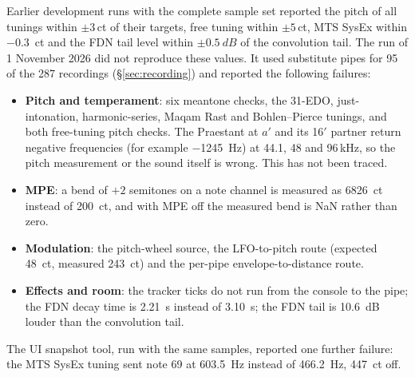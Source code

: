 \documentclass[11pt,a4paper,parskip=half,DIV=11,toc=bibliography]{scrartcl}
\begin{document}
Earlier development runs with the complete sample set reported the pitch of all tunings within $\pm3$\,ct of
their targets, free tuning within $\pm5$\,ct, MTS SysEx within \SI{-0.3}{ct} and the FDN tail level within
$\pm\SI{0.5}{dB}$ of the convolution tail. The run of 1 November 2026 did not reproduce these values. It used
substitute pipes for 95 of the 287 recordings (\S\ref{sec:recording}) and reported the following failures:
\begin{itemize}
  \item \textbf{Pitch and temperament}: six meantone checks, the 31-EDO, just-intonation, harmonic-series,
        Maqam Rast and Bohlen--Pierce tunings, and both free-tuning pitch checks. The Praestant at $a'$ and its
        16$'$ partner return negative frequencies (for example \SI{-1245}{Hz}) at 44.1, 48 and 96\,kHz, so the
        pitch measurement or the sound itself is wrong. This has not been traced.
  \item \textbf{MPE}: a bend of $+2$ semitones on a note channel is measured as \SI{6826}{ct} instead of
        \SI{200}{ct}, and with MPE off the measured bend is NaN rather than zero.
  \item \textbf{Modulation}: the pitch-wheel source, the LFO-to-pitch route (expected \SI{48}{ct}, measured
        \SI{243}{ct}) and the per-pipe envelope-to-distance route.
  \item \textbf{Effects and room}: the tracker ticks do not run from the console to the pipe; the FDN decay time
        is \SI{2.21}{s} instead of \SI{3.10}{s}; the FDN tail is \SI{10.6}{dB} louder than the convolution tail.
\end{itemize}
The UI snapshot tool, run with the same samples, reported one further failure: the MTS SysEx tuning sent note 69
at \SI{603.5}{Hz} instead of \SI{466.2}{Hz}, \SI{447}{ct} off.
\end{document}
